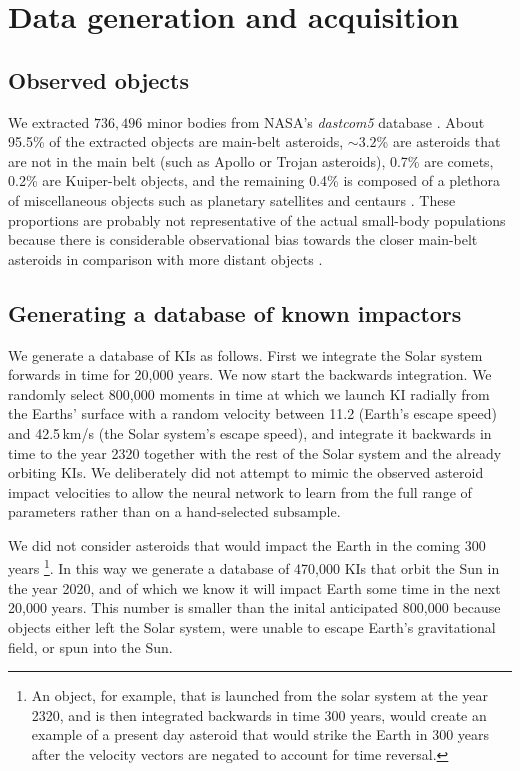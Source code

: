 \documentclass{aa}
\begin{document}
\section{Data generation and acquisition}
\label{SEC:Data}

\subsection{Observed objects}

We extracted $736,496$ minor bodies from NASA's \textit{dastcom5}
database \citep{dastcom5}. About 95.5\% of the extracted objects are
main-belt asteroids, $\sim 3.2$\% are asteroids that are not in the
main belt (such as Apollo or Trojan asteroids), 0.7\% are comets,
0.2\% are Kuiper-belt objects, and the remaining 0.4\% is composed of
a plethora of miscellaneous objects such as planetary satellites and
centaurs \citep{SolarSystemObjects}.  These proportions are probably
not representative of the actual small-body populations because there
is considerable observational bias towards the closer main-belt
asteroids in comparison with more distant objects
\citep{KBO_Population}.

\subsection{Generating a database of known impactors}

We generate a database of KIs as follows.  First we integrate the
Solar system forwards in time for 20,000 years. We now start the
backwards integration. We randomly select 800,000 moments in time at
which we launch KI radially from the Earths' surface with a random
velocity between 11.2 (Earth's escape speed) and 42.5\,km/s (the Solar
system's escape speed), and integrate it backwards in time to the year
2320 together with the rest of the Solar system and the already
orbiting KIs.  We deliberately did not attempt to mimic the observed
asteroid impact velocities to allow the neural network to learn from
the full range of parameters rather than on a hand-selected subsample.

We did not consider asteroids that would impact the Earth in the
coming 300 years \footnote{An object, for example, that is launched
  from the solar system at the year 2320, and is then integrated
  backwards in time 300 years, would create an example of a present
  day asteroid that would strike the Earth in 300 years after the
  velocity vectors are negated to account for time reversal.}. In this
way we generate a database of 470,000 KIs that orbit the Sun in the
year 2020, and of which we know it will impact Earth some time in the
next 20,000 years. This number is smaller than the inital anticipated
800,000 because objects either left the Solar system, were unable to
escape Earth's gravitational field, or spun into the Sun.
\end{document}
